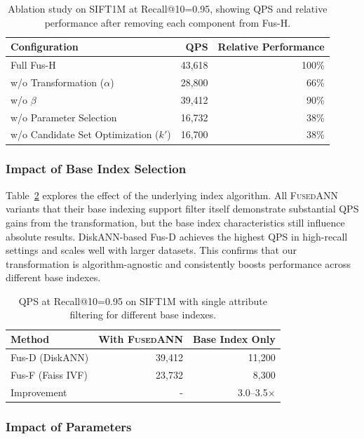\documentclass[numbers,sort]{article}
\begin{document}
\begin{table}[h]
\centering
\caption{Ablation study on SIFT1M at Recall@10=0.95, showing QPS and relative performance after removing each component from Fus-H.}
\label{tab:ablation}
\begin{tabular}{lrr}
\toprule
Configuration & QPS & Relative Performance \\
\midrule
Full Fus-H & 43,618 & 100\% \\
w/o Transformation ($\alpha$) & 28,800 & 66\% \\
w/o $\beta$ & 39,412 & 90\% \\
w/o Parameter Selection & 16,732 & 38\% \\
w/o Candidate Set Optimization ($k'$) & 16,700 & 38\% \\
\bottomrule
\end{tabular}
\end{table}

\subsubsection{Impact of Base Index Selection}

Table~\ref{tab:base_index} explores the effect of the underlying index algorithm. All \textsc{FusedANN} variants that their base indexing support filter itself demonstrate substantial QPS gains from the transformation, but the base index characteristics still influence absolute results. DiskANN-based Fus-D achieves the highest QPS in high-recall settings and scales well with larger datasets. This confirms that our transformation is algorithm-agnostic and consistently boosts performance across different base indexes.

\begin{table}[h]
\centering
\caption{QPS at Recall@10=0.95 on SIFT1M with single attribute filtering for different base indexes.}
\label{tab:base_index}
\begin{tabular}{lrr}
\toprule
Method & With \textsc{FusedANN} & Base Index Only \\
\midrule
Fus-D (DiskANN) & 39,412 & 11,200 \\
Fus-F (Faiss IVF) & 23,732 & 8,300 \\
\midrule
Improvement & - & 3.0--3.5$\times$ \\
\bottomrule
\end{tabular}
\end{table}

\subsubsection{Impact of Parameters}
\end{document}
